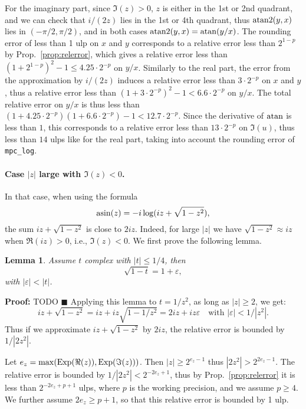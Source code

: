\documentclass [11pt]{article}
\DeclareMathOperator{\Exp}{\operatorname {Exp}}
\renewcommand {\epsilon}{\varepsilon}
\renewcommand {\leq}{\leqslant}
\newtheorem{lemma}[theorem]{Lemma}
\newenvironment{proof}{\noindent \textbf {Proof:}}{{\hspace* {\fill}$\blacksquare$}}
\begin{document}
For the imaginary part, since $\Im(z) > 0$, $z$ is either in the 1st or 2nd
quadrant, and we can check that $i/(2z)$ lies in the 1st or 4th
quadrant, thus ${\rm atan2}(y,x)$ lies in $(-\pi/2,\pi/2)$, and in both
cases ${\rm atan2}(y,x) = {\rm atan}(y/x)$.
The rounding error of less than 1 ulp on $x$ and $y$ corresponds to a
relative error less than $2^{1-p}$ by Prop.~\ref{prop:relerror}, which
gives a relative error less than $(1 + 2^{1-p})^2-1 \le 4.25 \cdot 2^{-p}$
on $y/x$.
Similarly to the real part, the error from the approximation by $i/(2z)$
induces a relative error less than $3 \cdot 2^{-p}$ on $x$ and $y$,
thus a relative error less than $(1 + 3 \cdot 2^{-p})^2-1 < 6.6 \cdot 2^{-p}$
on $y/x$. The total relative error on $y/x$ is thus less than
$(1 + 4.25 \cdot 2^{-p}) (1 + 6.6 \cdot 2^{-p}) - 1 < 12.7 \cdot 2^{-p}$.
Since the derivative of $\rm atan$ is less than $1$, this corresponds
to a relative error less than $13 \cdot 2^{-p}$ on $\Im(u)$,
thus less than $14$ ulps like for the real part,
taking into account the rounding error of \verb|mpc_log|.

\paragraph{Case $|z|$ large with $\Im(z) < 0$.}
In that case, when using the formula
\[ {\rm asin}(z) = -i \log (iz + \sqrt{1-z^2}), \]
the sum $iz + \sqrt{1-z^2}$ is close to $2iz$.
Indeed, for large $|z|$ we have $\sqrt{1-z^2} \approx iz$ when
$\Re(iz) > 0$, i.e., $\Im(z) < 0$.
We first prove the following lemma.
\begin{lemma}
  Assume $t$ complex with $|t| \leq 1/4$, then
  \[ \sqrt{1-t} = 1 + \varepsilon, \]
  with $|\varepsilon| < |t|$.
\end{lemma}
\begin{proof}
  TODO
\end{proof}
Applying this lemma to $t = 1/z^2$, as long as $|z| \ge 2$, we get:
\[ iz + \sqrt{1-z^2} = iz + iz \sqrt{1-1/z^2}
  = 2iz + iz \epsilon \quad
  \mbox{with $|\varepsilon| < 1/|z^2|$.} \]
Thus if we approximate $iz + \sqrt{1-z^2}$ by $2iz$,
the relative error is bounded by $1/|2z^2|$.

Let $e_z = {\rm max}(\Exp(\Re(z)),\Exp(\Im(z)))$.
Then $|z| \ge 2^{e_z-1}$ thus $|2z^2| > 2^{2e_z-1}$.
The relative error is bounded by $1/|2z^2| < 2^{-2e_z+1}$,
thus by Prop.~\ref{prop:relerror} it is less than $2^{-2e_z+p+1}$ ulps,
where $p$ is the working precision, and we assume $p \ge 4$.
We further assume $2e_z \ge p+1$, so that this relative error is bounded
by 1 ulp.
\end{document}
